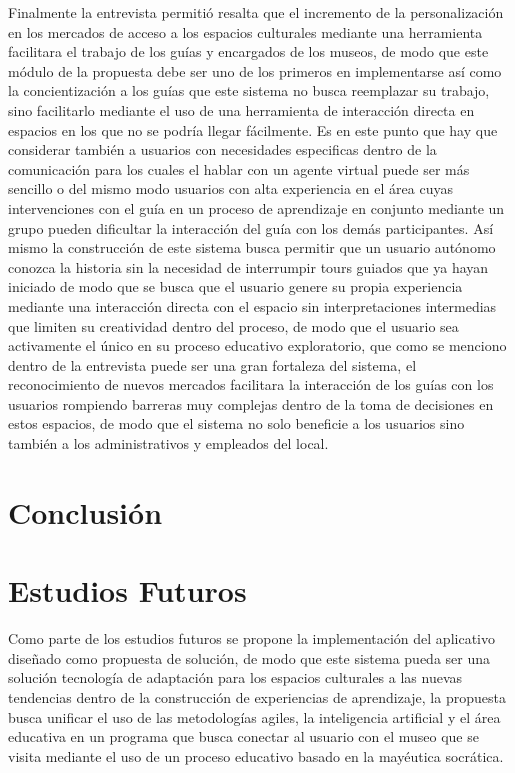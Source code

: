 \documentclass[pdflatex,sn-mathphys-num]{sn-jnl}%
\theoremstyle{thmstyleone}%
\theoremstyle{thmstyletwo}%
\theoremstyle{thmstylethree}%
\begin{document}
Finalmente la entrevista permitió resalta que el incremento de la personalización en los mercados de acceso a los espacios culturales mediante una herramienta facilitara el trabajo de los guías y encargados de los museos, de modo que este módulo de la propuesta debe ser uno de los primeros en implementarse así como la concientización a los guías que este sistema no busca reemplazar su trabajo, sino facilitarlo mediante el uso de una herramienta de interacción directa en espacios en los que no se podría llegar fácilmente.
Es en este punto que hay que considerar también a usuarios con necesidades especificas dentro de la comunicación para los cuales el hablar con un agente virtual puede ser más sencillo o del mismo modo usuarios con alta experiencia en el área cuyas intervenciones con el guía en un proceso de aprendizaje en conjunto mediante un grupo pueden dificultar la interacción del guía con los demás participantes.
Así mismo la construcción de este sistema busca permitir que un usuario autónomo conozca la historia sin la necesidad de interrumpir tours guiados que ya hayan iniciado de modo que se busca que el usuario genere su propia experiencia mediante una interacción directa con el espacio sin interpretaciones intermedias que limiten su creatividad dentro del proceso, de modo que el usuario sea activamente el único en su proceso educativo exploratorio, que como se menciono dentro de la entrevista puede ser una gran fortaleza del sistema, el reconocimiento de nuevos mercados facilitara la interacción de los guías con los usuarios rompiendo barreras muy complejas dentro de la toma de decisiones en estos espacios, de modo que el sistema no solo beneficie a los usuarios sino también a los administrativos y empleados del local.




\section{Conclusión}\label{sec13}








\section{Estudios Futuros}\label{secA1}
Como parte de los estudios futuros se propone la implementación del aplicativo diseñado como propuesta de solución, de modo que este sistema pueda ser una solución tecnología de adaptación para los espacios culturales a las nuevas tendencias dentro de la construcción de experiencias de aprendizaje, la propuesta busca unificar el uso de las metodologías agiles, la inteligencia artificial y el área educativa en un programa que busca conectar al usuario con el museo que se visita mediante el uso de un proceso educativo basado en la mayéutica socrática.
\end{document}
